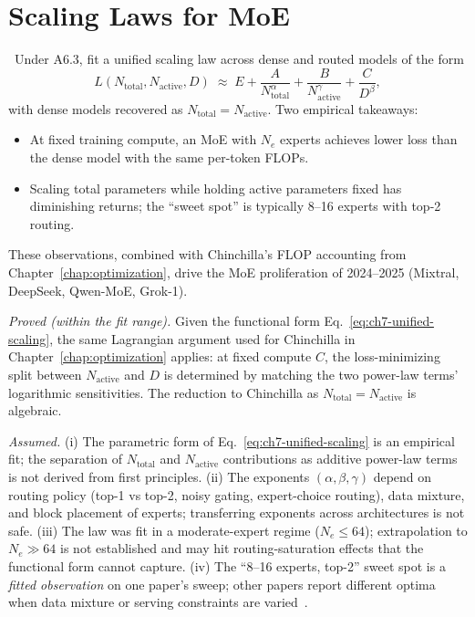 \section{Scaling Laws for MoE}

\Emp\ Under A6.3, \citet{clark2022unified} fit a unified scaling law
across dense and routed models of the form
\begin{equation}
\label{eq:ch7-unified-scaling}
L(N_{\mathrm{total}}, N_{\mathrm{active}}, D) \;\approx\;
  E + \frac{A}{N_{\mathrm{total}}^\alpha} +
      \frac{B}{N_{\mathrm{active}}^\gamma} +
      \frac{C}{D^\beta},
\end{equation}
with dense models recovered as $N_{\mathrm{total}} = N_{\mathrm{active}}$.
Two empirical takeaways:
\begin{itemize}
  \item At fixed training compute, an MoE with $N_e$ experts achieves
        lower loss than the dense model with the same per-token
        FLOPs.
  \item Scaling total parameters while holding active parameters
        fixed has diminishing returns; the ``sweet spot'' is
        typically 8--16 experts with top-2 routing.
\end{itemize}
These observations, combined with Chinchilla's FLOP accounting from
Chapter~\ref{chap:optimization}, drive the MoE proliferation of 2024--2025 (Mixtral, DeepSeek,
Qwen-MoE, Grok-1).

\begin{provedassumed}
\emph{Proved (within the fit range).}
Given the functional form Eq.~\eqref{eq:ch7-unified-scaling}, the
same Lagrangian argument used for Chinchilla in Chapter~\ref{chap:optimization} applies: at
fixed compute $C$, the loss-minimizing split between
$N_{\mathrm{active}}$ and $D$ is determined by matching the two
power-law terms' logarithmic sensitivities. The reduction to
Chinchilla as $N_{\mathrm{total}} = N_{\mathrm{active}}$ is algebraic.

\emph{Assumed.}
(i) The parametric form of Eq.~\eqref{eq:ch7-unified-scaling} is
an empirical fit; the separation of $N_{\mathrm{total}}$ and
$N_{\mathrm{active}}$ contributions as additive power-law terms is
not derived from first principles.
(ii) The exponents $(\alpha, \beta, \gamma)$ depend on routing
policy (top-1 vs top-2, noisy gating, expert-choice routing), data
mixture, and block placement of experts; transferring exponents
across architectures is not safe.
(iii) The law was fit in a moderate-expert regime ($N_e \le 64$);
extrapolation to $N_e \gg 64$ is not established and may hit
routing-saturation effects that the functional form cannot capture.
(iv) The ``8--16 experts, top-2'' sweet spot is a \emph{fitted
observation} on one paper's sweep; other papers report
different optima when data mixture or serving constraints are
varied~\citep{fedus2021switch,jiang2024mixtral}.
\end{provedassumed}

